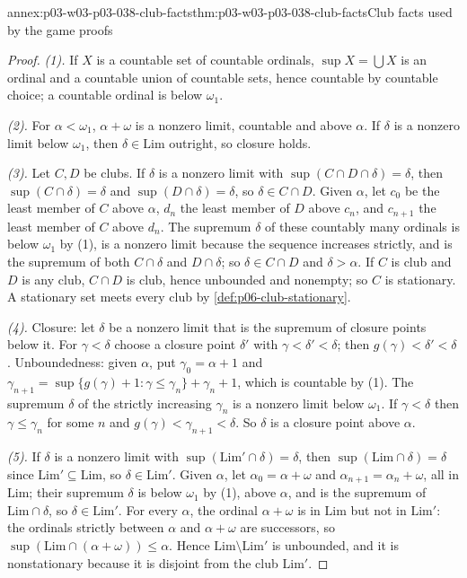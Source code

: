 \begin{annexitem}{annex:p03-w03-p03-038-club-facts}{thm:p03-w03-p03-038-club-facts}{Club facts used by the game proofs}
\begin{proof}
\emph{(1).} If \(X\) is a countable set of countable ordinals, \(\sup X=\bigcup X\)
is an ordinal and a countable union of countable sets, hence countable by
countable choice; a countable ordinal is below \(\omega_1\).

\emph{(2).} For \(\alpha<\omega_1\), \(\alpha+\omega\) is a nonzero limit,
countable and above \(\alpha\). If \(\delta\) is a nonzero limit below
\(\omega_1\), then \(\delta\in\mathrm{Lim}\) outright, so closure holds.

\emph{(3).} Let \(C,D\) be clubs. If \(\delta\) is a nonzero limit with
\(\sup(C\cap D\cap\delta)=\delta\), then \(\sup(C\cap\delta)=\delta\) and
\(\sup(D\cap\delta)=\delta\), so \(\delta\in C\cap D\). Given \(\alpha\), let
\(c_0\) be the least member of \(C\) above \(\alpha\), \(d_n\) the least member of
\(D\) above \(c_n\), and \(c_{n+1}\) the least member of \(C\) above \(d_n\). The
supremum \(\delta\) of these countably many ordinals is below \(\omega_1\) by
(1), is a nonzero limit because the sequence increases strictly, and is the
supremum of both \(C\cap\delta\) and \(D\cap\delta\); so \(\delta\in C\cap D\)
and \(\delta>\alpha\). If \(C\) is club and \(D\) is any club, \(C\cap D\) is
club, hence unbounded and nonempty; so \(C\) is stationary. A stationary set
meets every club by \cref{def:p06-club-stationary}.

\emph{(4).} Closure: let \(\delta\) be a nonzero limit that is the supremum of
closure points below it. For \(\gamma<\delta\) choose a closure point
\(\delta'\) with \(\gamma<\delta'<\delta\); then \(g(\gamma)<\delta'<\delta\).
Unboundedness: given \(\alpha\), put \(\gamma_0=\alpha+1\) and
\(\gamma_{n+1}=\sup\{g(\gamma)+1:\gamma\le\gamma_n\}+\gamma_n+1\), which is
countable by (1). The supremum \(\delta\) of the strictly increasing
\(\gamma_n\) is a nonzero limit below \(\omega_1\). If \(\gamma<\delta\) then
\(\gamma\le\gamma_n\) for some \(n\) and
\(g(\gamma)<\gamma_{n+1}<\delta\). So \(\delta\) is a closure point above
\(\alpha\).

\emph{(5).} If \(\delta\) is a nonzero limit with
\(\sup(\mathrm{Lim}'\cap\delta)=\delta\), then \(\sup(\mathrm{Lim}\cap\delta)=\delta\)
since \(\mathrm{Lim}'\subseteq\mathrm{Lim}\), so \(\delta\in\mathrm{Lim}'\).
Given \(\alpha\), let \(\alpha_0=\alpha+\omega\) and
\(\alpha_{n+1}=\alpha_n+\omega\), all in \(\mathrm{Lim}\); their supremum
\(\delta\) is below \(\omega_1\) by (1), above \(\alpha\), and is the supremum
of \(\mathrm{Lim}\cap\delta\), so \(\delta\in\mathrm{Lim}'\). For every
\(\alpha\), the ordinal \(\alpha+\omega\) is in \(\mathrm{Lim}\) but not in
\(\mathrm{Lim}'\): the ordinals strictly between \(\alpha\) and
\(\alpha+\omega\) are successors, so \(\sup(\mathrm{Lim}\cap(\alpha+\omega))\le\alpha\).
Hence \(\mathrm{Lim}\setminus\mathrm{Lim}'\) is unbounded, and it is
nonstationary because it is disjoint from the club \(\mathrm{Lim}'\).
\end{proof}
\end{annexitem}

